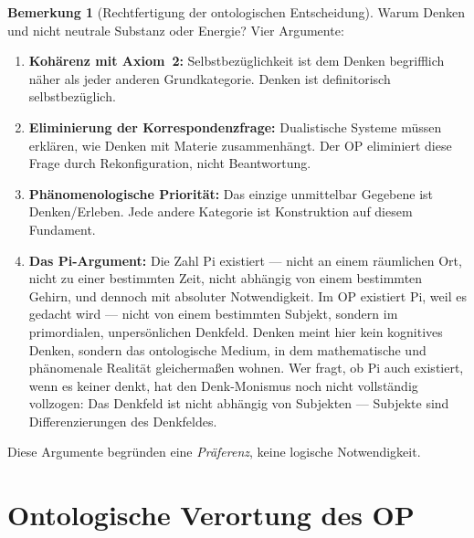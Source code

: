 \documentclass[11pt,a4paper]{article}
\theoremstyle{plain}
\theoremstyle{definition}
\newtheorem{remark}{Bemerkung}[section]
\begin{document}
\begin{remark}[Rechtfertigung der ontologischen Entscheidung]
Warum Denken und nicht neutrale Substanz oder Energie? Vier Argumente:
\begin{enumerate}
  \item \textbf{Koh\"{a}renz mit Axiom~2:} Selbstbez\"{u}glichkeit ist dem Denken
        begrifflich n\"{a}her als jeder anderen Grundkategorie. Denken ist definitorisch
        selbstbez\"{u}glich.
  \item \textbf{Eliminierung der Korrespondenzfrage:} Dualistische Systeme m\"{u}ssen
        erkl\"{a}ren, wie Denken mit Materie zusammenh\"{a}ngt. Der OP eliminiert diese
        Frage durch Rekonfiguration, nicht Beantwortung.
  \item \textbf{Ph\"{a}nomenologische Priorit\"{a}t:} Das einzige unmittelbar Gegebene
        ist Denken/Erleben. Jede andere Kategorie ist Konstruktion auf diesem Fundament.
  \item \textbf{Das Pi-Argument:} Die Zahl Pi existiert --- nicht an einem r\"{a}umlichen
        Ort, nicht zu einer bestimmten Zeit, nicht abh\"{a}ngig von einem bestimmten
        Gehirn, und dennoch mit absoluter Notwendigkeit. Im OP existiert Pi, weil es
        gedacht wird --- nicht von einem bestimmten Subjekt, sondern im primordialen,
        unpers\"{o}nlichen Denkfeld. \glqq{}Denken\grqq{} meint hier kein kognitives
        Denken, sondern das ontologische Medium, in dem mathematische und ph\"{a}nomenale
        Realit\"{a}t gleicherma\ss{}en wohnen. Wer fragt, ob Pi auch existiert, wenn
        es keiner denkt, hat den Denk-Monismus noch nicht vollst\"{a}ndig vollzogen:
        Das Denkfeld ist nicht abh\"{a}ngig von Subjekten --- Subjekte sind Differenzierungen
        des Denkfeldes.
\end{enumerate}
Diese Argumente begr\"{u}nden eine \emph{Pr\"{a}ferenz}, keine logische Notwendigkeit.
\end{remark}

\section{Ontologische Verortung des OP}
\end{document}
